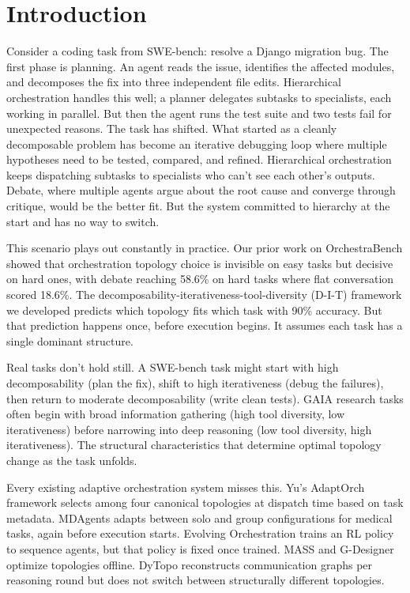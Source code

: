 \section{Introduction}\label{introduction}

Consider a coding task from SWE-bench: resolve a Django migration bug.
The first phase is planning. An agent reads the issue, identifies the
affected modules, and decomposes the fix into three independent file
edits. Hierarchical orchestration handles this well; a planner delegates
subtasks to specialists, each working in parallel. But then the agent
runs the test suite and two tests fail for unexpected reasons. The task
has shifted. What started as a cleanly decomposable problem has become
an iterative debugging loop where multiple hypotheses need to be tested,
compared, and refined. Hierarchical orchestration keeps dispatching
subtasks to specialists who can't see each other's outputs. Debate,
where multiple agents argue about the root cause and converge through
critique, would be the better fit. But the system committed to hierarchy
at the start and has no way to switch.

This scenario plays out constantly in practice. Our prior work on
OrchestraBench \citep{anonymous_2026} showed that orchestration topology
choice is invisible on easy tasks but decisive on hard ones, with debate
reaching 58.6\% on hard tasks where flat conversation scored 18.6\%. The
decomposability-iterativeness-tool-diversity (D-I-T) framework we
developed predicts which topology fits which task with 90\% accuracy.
But that prediction happens once, before execution begins. It assumes
each task has a single dominant structure.

Real tasks don't hold still. A SWE-bench task might start with high
decomposability (plan the fix), shift to high iterativeness (debug the
failures), then return to moderate decomposability (write clean tests).
GAIA research tasks often begin with broad information gathering (high
tool diversity, low iterativeness) before narrowing into deep reasoning
(low tool diversity, high iterativeness). The structural characteristics
that determine optimal topology change as the task unfolds.

Every existing adaptive orchestration system misses this. Yu's AdaptOrch
framework \citep{adaptorch_2026} selects among four canonical topologies
at dispatch time based on task metadata. MDAgents \citep{kim_2024}
adapts between solo and group configurations for medical tasks, again
before execution starts. Evolving Orchestration \citep{evolving_2025}
trains an RL policy to sequence agents, but that policy is fixed once
trained. MASS \citep{mass_2025} and G-Designer \citep{gdesigner_2025}
optimize topologies offline. DyTopo \citep{dytopo_2026} reconstructs
communication graphs per reasoning round but does not switch between
structurally different topologies.

